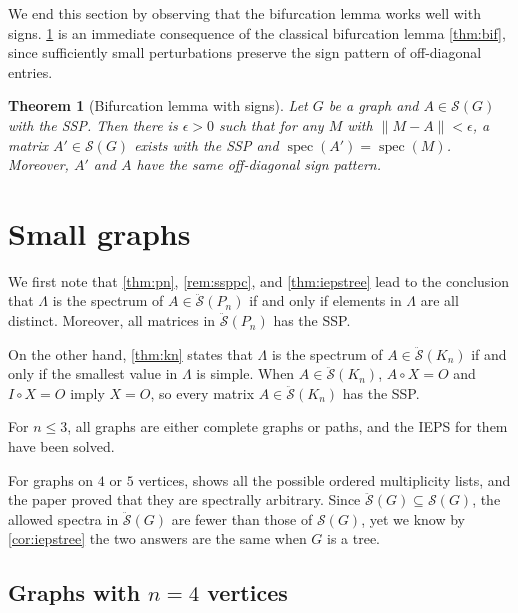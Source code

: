 \documentclass{article}
\newtheorem{theorem}{Theorem}[section]
\theoremstyle{definition}
\newcommand{\spec}{\operatorname{spec}}
\newcommand{\mptn}{\mathcal{S}}
\newcommand{\mdso}{\ddot{\mathcal{S}}}
\begin{document}
We end this section by observing that the bifurcation lemma works well with signs.  \cref{thm:bifsign} is an immediate consequence of the classical bifurcation lemma \cref{thm:bif}, since sufficiently small perturbations preserve the sign pattern of off-diagonal entries.

\begin{theorem}[Bifurcation lemma with signs]
\label{thm:bifsign}
Let $G$ be a graph and $A\in\mptn(G)$ with the SSP.  Then there is $\epsilon > 0$ such that for any $M$ with $\|M - A\| < \epsilon$, a matrix $A'\in\mptn(G)$ exists with the SSP and $\spec(A') = \spec(M)$.  Moreover, $A'$ and $A$ have the same off-diagonal sign pattern.
\end{theorem}

\section{Small graphs}
\label{sec:small}

We first note that \cref{thm:pn}, \cref{rem:ssppc}, and \cref{thm:iepstree} lead to the conclusion that $\Lambda$ is the spectrum of $A\in\mdso(P_n)$ if and only if elements in $\Lambda$ are all distinct.  Moreover, all matrices in $\mdso(P_n)$ has the SSP.

On the other hand, \cref{thm:kn} states that $\Lambda$ is the spectrum of $A\in\mdso(K_n)$ if and only if the smallest value in $\Lambda$ is simple.  When $A\in\mdso(K_n)$, $A\circ X = O$ and $I\circ X = O$ imply $X = O$, so every matrix $A\in\mdso(K_n)$ has the SSP.  

For $n \leq 3$, all graphs are either complete graphs or paths, and the IEPS for them have been solved.

For graphs on $4$ or $5$ vertices, \cite[Fig.~1]{IEPG2} shows all the possible ordered multiplicity lists, and the paper proved that they are spectrally arbitrary.  Since $\mdso(G)\subseteq\mptn(G)$, the allowed spectra in $\mdso(G)$ are fewer than those of $\mptn(G)$, yet we know by \cref{cor:iepstree} the two answers are the same when $G$ is a tree.

\subsection{Graphs with \texorpdfstring{$n = 4$}{n = 4} vertices}
\label{ssec:graph4}
\end{document}
